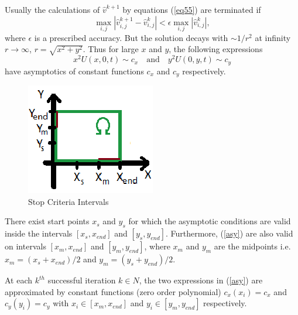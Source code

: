 \documentclass[preprint]{elsarticle}
\newcommand{\rf}[1]{(\ref{#1})}
\begin{document}
Usually  the calculations of  $\widehat{v}^{k+1} $ by equations \rf{eq55} are  terminated if
\begin{equation*}
\max_{i,j} |\widehat{v}^{k+1}_{i,j}-\widehat{v}^{k}_{i,j}| < \epsilon \max_{i,j} |\widehat{v}^{k}_{i,j}| ,
\end{equation*}
where $\epsilon $ is a prescribed accuracy.  But the solution decays with $\sim1/{r}^{2}$ at infinity $r \rightarrow \infty$, $r = \sqrt{{x}^{2} + {y}^{2}}$. Thus for large $x$ and $y$, the following expressions 
\begin{equation}\label{asy}
x^{2}U(x,0,t) \sim c_{x} \quad \textrm{and} \quad   y^{2}U(0,y,t) \sim c_{y}
\end{equation}
have asymptotics of constant functions  $c_{x}$ and $c_{y}$ respectively.
\begin{figure}
     \begin{center}
     \includegraphics[scale=1.2]{StopCrit.eps}
     \end{center}
	\caption{Stop Criteria Intervals}
	\label{fig:StopCritf}
\end{figure}
There exist start points $x_{s}$ and $y_{s}$ for which the asymptotic conditions
are valid inside the intervals $[x_{s}, x_{end}]$ and $[y_{s}, y_{end}]$. Furthermore, (\ref{asy}) are also valid on intervals $[x_{m}, x_{end}]$ and $[y_{m}, y_{end}]$, where $x_{m}$ and $y_{m}$ are the midpoints i.e.
$x_{m} = (x_{s} + x_{end})/2$ and $y_{m} = (y_{s} + y_{end})/2$. 


At each $k^{th}$ successful iteration $k \in N$, the two expressions in \rf{asy} are approximated by constant functions (zero order polynomial) $c_{x}(x_{i}) = c_{x}$ and $c_{y}(y_{i}) = c_{y}$ with $x_{i} \in [x_{m}, x_{end}]$ and $y_{i} \in [y_{m}, y_{end}]$ respectively.
\end{document}
